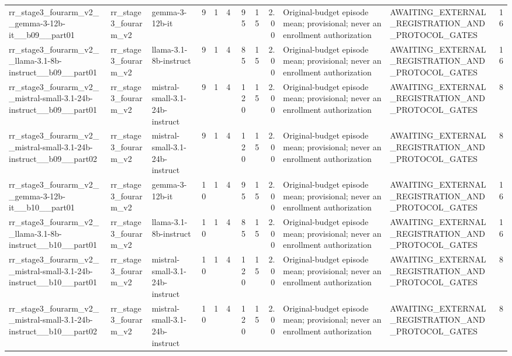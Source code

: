 \begin{tabular}{lllrrrrrrllr}
rr\_stage3\_fourarm\_v2\_\_gemma-3-12b-it\_\_b09\_\_part01 & rr\_stage3\_fourarm\_v2 & gemma-3-12b-it & 9 & 1 & 4 & 95 & 15 & 2.00 & Original-budget episode mean; provisional; never an enrollment authorization & AWAITING\_EXTERNAL\_REGISTRATION\_AND\_PROTOCOL\_GATES & 16 \\
rr\_stage3\_fourarm\_v2\_\_llama-3.1-8b-instruct\_\_b09\_\_part01 & rr\_stage3\_fourarm\_v2 & llama-3.1-8b-instruct & 9 & 1 & 4 & 85 & 15 & 2.00 & Original-budget episode mean; provisional; never an enrollment authorization & AWAITING\_EXTERNAL\_REGISTRATION\_AND\_PROTOCOL\_GATES & 16 \\
rr\_stage3\_fourarm\_v2\_\_mistral-small-3.1-24b-instruct\_\_b09\_\_part01 & rr\_stage3\_fourarm\_v2 & mistral-small-3.1-24b-instruct & 9 & 1 & 4 & 120 & 15 & 2.00 & Original-budget episode mean; provisional; never an enrollment authorization & AWAITING\_EXTERNAL\_REGISTRATION\_AND\_PROTOCOL\_GATES & 8 \\
rr\_stage3\_fourarm\_v2\_\_mistral-small-3.1-24b-instruct\_\_b09\_\_part02 & rr\_stage3\_fourarm\_v2 & mistral-small-3.1-24b-instruct & 9 & 1 & 4 & 120 & 15 & 2.00 & Original-budget episode mean; provisional; never an enrollment authorization & AWAITING\_EXTERNAL\_REGISTRATION\_AND\_PROTOCOL\_GATES & 8 \\
rr\_stage3\_fourarm\_v2\_\_gemma-3-12b-it\_\_b10\_\_part01 & rr\_stage3\_fourarm\_v2 & gemma-3-12b-it & 10 & 1 & 4 & 95 & 15 & 2.00 & Original-budget episode mean; provisional; never an enrollment authorization & AWAITING\_EXTERNAL\_REGISTRATION\_AND\_PROTOCOL\_GATES & 16 \\
rr\_stage3\_fourarm\_v2\_\_llama-3.1-8b-instruct\_\_b10\_\_part01 & rr\_stage3\_fourarm\_v2 & llama-3.1-8b-instruct & 10 & 1 & 4 & 85 & 15 & 2.00 & Original-budget episode mean; provisional; never an enrollment authorization & AWAITING\_EXTERNAL\_REGISTRATION\_AND\_PROTOCOL\_GATES & 16 \\
rr\_stage3\_fourarm\_v2\_\_mistral-small-3.1-24b-instruct\_\_b10\_\_part01 & rr\_stage3\_fourarm\_v2 & mistral-small-3.1-24b-instruct & 10 & 1 & 4 & 120 & 15 & 2.00 & Original-budget episode mean; provisional; never an enrollment authorization & AWAITING\_EXTERNAL\_REGISTRATION\_AND\_PROTOCOL\_GATES & 8 \\
rr\_stage3\_fourarm\_v2\_\_mistral-small-3.1-24b-instruct\_\_b10\_\_part02 & rr\_stage3\_fourarm\_v2 & mistral-small-3.1-24b-instruct & 10 & 1 & 4 & 120 & 15 & 2.00 & Original-budget episode mean; provisional; never an enrollment authorization & AWAITING\_EXTERNAL\_REGISTRATION\_AND\_PROTOCOL\_GATES & 8 \\

\end{tabular}
